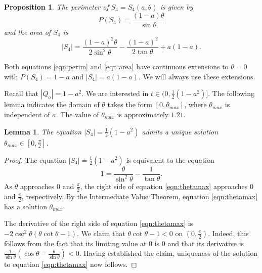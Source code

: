 \documentclass[leqno]{article}
\numberwithin{equation}{section}
\theoremstyle{definition}
\theoremstyle{remark}
\theoremstyle{plain}
\newtheorem{lemma}[equation]{Lemma}
\newtheorem{proposition}[equation]{Proposition}
\begin{document}
\begin{proposition}\label{prop:geo}The perimeter of $S_4 = S_4(a,\theta)$ is given by \begin{equation}\label{eqn:perim}P(S_4) = \frac{(1-a)\theta}{\sin \theta}\end{equation} and the area of $S_4$ is \begin{equation}\label{eqn:area}|S_4| = \frac{(1-a)^2\theta}{2\sin^2 \theta} - \frac{(1-a)^2}{2\tan \theta} + a(1-a).\end{equation}

\end{proposition}


Both equations \eqref{eqn:perim} and \eqref{eqn:area} have continuous extensions to $\theta = 0$ with $P(S_4) = 1-a$ and $|S_4| = a(1-a)$.  We will always use these extensions.



Recall that $|Q_a| = 1-a^2$. We are interested in $t\in (0, \tfrac{1}{2}(1-a^2)]$.  The following lemma indicates the domain of $\theta$ takes the form $[0,\theta_{max}]$, where $\theta_{max}$ is independent of $a$. The value of $\theta_{max}$ is approximately $1.21$.


\begin{lemma}\label{lem:thetamax}  The equation $|S_4| = \frac{1}{2}(1-a^2)$ admits a unique solution $\theta_{max}\in[0,\tfrac{\pi}{2}]$.

\end{lemma}

\begin{proof} The equation $|S_4| = \frac{1}{2}(1-a^2)$ is equivalent to the equation \begin{equation}\label{eqn:thetamax} 1 = \frac{\theta}{\sin^2\theta} - \frac{1}{\tan\theta}.\end{equation} As $\theta$ approaches $0$ and $\tfrac{\pi}{2}$, the right side of equation \eqref{eqn:thetamax} approaches $0 $ and $\tfrac{\pi}{2}$, respectively.  By the Intermediate Value Theorem, equation \eqref{eqn:thetamax} has a solution $\theta_{max}$.

The derivative of the right side of equation \eqref{eqn:thetamax} is $-2\csc^2 \theta \left(\theta \cot \theta-1\right)$.  We claim that $\theta\cot\theta-1 < 0$ on $(0,\frac{\pi}{2})$.  Indeed, this follows from the fact that its limiting value at $0$ is $0$ and that its derivative is $\frac{1}{\sin\theta}\left(\cos\theta - \frac{\theta}{\sin\theta}\right) < 0$.  Having established the claim, uniqueness of the solution to equation \eqref{eqn:thetamax} now follows.

\end{proof}
\end{document}
